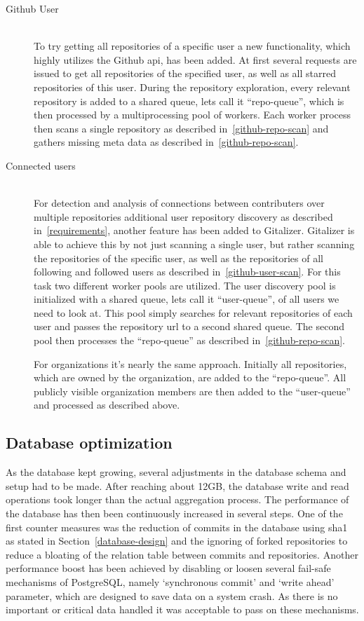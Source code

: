 \begin{description}
    \item[Github User]\label{github-repo-scan} \hfill \\
        To try getting all repositories of a specific user a new functionality, which highly utilizes the Github \ac{api}, has been added.
        At first several requests are issued to get all repositories of the specified user, as well as all starred repositories of this user.
        During the repository exploration, every relevant repository is added to a shared queue, lets call it ``repo-queue'', which is then processed by a multiprocessing pool of workers.
        Each worker process then scans a single repository as described in~\ref{github-repo-scan} and gathers missing meta data as described in~\ref{github-repo-scan}.


    \item[Connected users]\label{github-repo-scan} \hfill \\
        For detection and analysis of connections between contributers over multiple repositories additional user repository discovery as described in~\ref{requirements}, another feature has been added to Gitalizer.
        Gitalizer is able to achieve this by not just scanning a single user, but rather scanning the repositories of the specific user, as well as the repositories of all following and followed users as described in~\ref{github-user-scan}.
        For this task two different worker pools are utilized.
        The user discovery pool is initialized with a shared queue, lets call it ``user-queue'', of all users we need to look at.
        This pool simply searches for relevant repositories of each user and passes the repository \ac{url} to a second shared queue.
        The second pool then processes the ``repo-queue'' as described in~\ref{github-repo-scan}.

        For organizations it's nearly the same approach.
        Initially all repositories, which are owned by the organization, are added to the ``repo-queue''.
        All publicly visible organization members are then added to the ``user-queue'' and processed as described above.
\end{description}


\subsection{Database optimization}
As the database kept growing, several adjustments in the database schema and setup had to be made.
After reaching about 12\ac{GB}, the database write and read operations took longer than the actual aggregation process.
The performance of the database has then been continuously increased in several steps.
One of the first counter measures was the reduction of commits in the database using \ac{sha1} as stated in Section~\ref{database-design} and the ignoring of forked repositories to reduce a bloating of the relation table between commits and repositories.
Another performance boost has been achieved by disabling or loosen several fail-safe mechanisms of PostgreSQL, namely `synchronous commit' and `write ahead' parameter, which are designed to save data on a system crash.
As there is no important or critical data handled it was acceptable to pass on these mechanisms.


